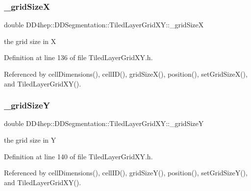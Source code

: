 \subsubsection{\texorpdfstring{\+\_\+grid\+SizeX}{\_gridSizeX}}
{\footnotesize\ttfamily double D\+D4hep\+::\+D\+D\+Segmentation\+::\+Tiled\+Layer\+Grid\+X\+Y\+::\+\_\+grid\+SizeX\hspace{0.3cm}{\ttfamily [protected]}}



the grid size in X 



Definition at line 136 of file Tiled\+Layer\+Grid\+X\+Y.\+h.



Referenced by cell\+Dimensions(), cell\+I\+D(), grid\+Size\+X(), position(), set\+Grid\+Size\+X(), and Tiled\+Layer\+Grid\+X\+Y().

\hypertarget{class_d_d4hep_1_1_d_d_segmentation_1_1_tiled_layer_grid_x_y_ae544578762aec1e7bb735efca00a28b9}{}\label{class_d_d4hep_1_1_d_d_segmentation_1_1_tiled_layer_grid_x_y_ae544578762aec1e7bb735efca00a28b9} 
\subsubsection{\texorpdfstring{\+\_\+grid\+SizeY}{\_gridSizeY}}
{\footnotesize\ttfamily double D\+D4hep\+::\+D\+D\+Segmentation\+::\+Tiled\+Layer\+Grid\+X\+Y\+::\+\_\+grid\+SizeY\hspace{0.3cm}{\ttfamily [protected]}}



the grid size in Y 



Definition at line 140 of file Tiled\+Layer\+Grid\+X\+Y.\+h.



Referenced by cell\+Dimensions(), cell\+I\+D(), grid\+Size\+Y(), position(), set\+Grid\+Size\+Y(), and Tiled\+Layer\+Grid\+X\+Y().

\hypertarget{class_d_d4hep_1_1_d_d_segmentation_1_1_tiled_layer_grid_x_y_a4dfef8cb6d1319b076579fd565241c84}{}\label{class_d_d4hep_1_1_d_d_segmentation_1_1_tiled_layer_grid_x_y_a4dfef8cb6d1319b076579fd565241c84} 
